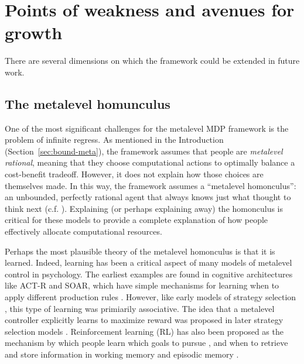 \section{Points of weakness and avenues for growth}

There are several dimensions on which the framework could be extended in future work.

\subsection{The metalevel homunculus}

One of the most significant challenges for the metalevel MDP framework is the problem of infinite regress. As mentioned in the Introduction (Section~\ref{sec:bound-meta}), the framework assumes that people are \emph{metalevel rational}, meaning that they choose computational actions to optimally balance a cost-benefit tradeoff. However, it does not explain how those choices are themselves made. In this way, the framework assumes a ``metalevel homonculus'': an unbounded, perfectly rational agent that always knows just what thought to think next (c.f. \citealp{hazy2006banishing,botvinick2014computational}). Explaining (or perhaps explaining away) the homonculus is critical for these models to provide a complete explanation of how people effectively allocate computational resources.

Perhaps the most plausible theory of the metalevel homonculus is that it is learned. Indeed, learning has been a critical aspect of many models of metalevel control in psychology. The earliest examples are found in cognitive architectures like ACT-R and SOAR, which have simple mechanisms for learning when to apply different production rules \citep{laird1986chunking}. However, like early models of strategy selection \citep{shrager1998scads}, this type of learning was primiarily associative. The idea that a metalevel controller explicitly learns to maximize reward was proposed in later strategy selection models \citet{erev2005adaptation,rieskamp2006ssl,lieder2017strategy}. Reinforcement learning (RL) has also been proposed as the mechanism by which people learn which goals to pursue \citep{cushman2015habitual}, and when to retrieve and store information in working memory \citep{oreilly2006making,todd2008learning} and episodic memory \citep{lu2022neural}. 

